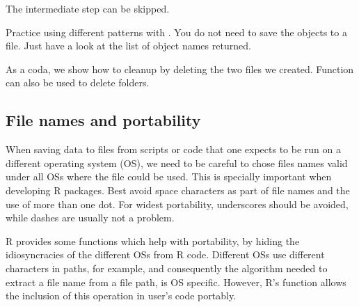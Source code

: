 \documentclass[krantz2,ChapterTOCs]{krantz}\usepackage{knitr}
\begin{document}
The intermediate step can be skipped.
\begin{knitrout}\footnotesize
{}\color{fgcolor}\begin{kframe}
\begin{alltt}
\hlstd{(} \hlstd{=} \hlstd{(} \hlstd{=} \hlstd{),}  \hlstd{=} \hlstd{)}
\end{alltt}
\end{kframe}
\end{knitrout}

\begin{playground}
Practice using different patterns with . You do not need to save the objects to a file. Just have a look at the list of object names returned.
\end{playground}

As a coda, we show how to cleanup by deleting the two files we created. Function  can also be used to delete folders.
\begin{knitrout}\footnotesize
{}\color{fgcolor}\begin{kframe}
\begin{alltt}
\hlstd{(}\hlstd{(}\hlstd{,} \hlstd{))}
\end{alltt}
\end{kframe}
\end{knitrout}

\subsection{File names and portability}\label{sec:files:filenames}

When saving data to files from scripts or code that one expects to be run on a different operating system (OS), we need to be careful to chose files names valid under all OSs where the file could be used. This is specially important when developing R packages. Best avoid space characters as part of file names and the use of more than one dot. For widest portability, underscores should be avoided, while dashes are usually not a problem.

R provides some functions which help with portability, by hiding the idiosyncracies of the different OSs from R code. Different OSs use different characters in paths, for example, and consequently the algorithm needed to extract a file name from a file path, is OS specific. However, R's function  allows the inclusion of this operation in user's code portably.
\end{document}
